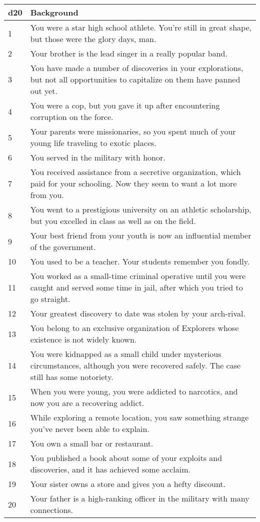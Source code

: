 \begin{table*}
\begin{tabularx}{\textwidth}{| p{} | p{} |}
\hline
\textbf{d20} & \textbf{Background} \\
\hline
1 & You were a star high school athlete. You’re still in great shape, but those were the glory days, man. \\ \hline
2 & Your brother is the lead singer in a really popular band. \\ \hline
3 & You have made a number of discoveries in your explorations, but not all opportunities to capitalize on them have panned out yet.  \\ \hline
4 & You were a cop, but you gave it up after encountering corruption on the force.  \\ \hline
5 & Your parents were missionaries, so you spent much of your young life traveling to exotic places. \\ \hline
6 & You served in the military with honor. \\ \hline
7 & You received assistance from a secretive organization, which paid for your schooling. Now they seem to want a lot more from you. \\ \hline
8 & You went to a prestigious university on an athletic scholarship, but you excelled in class as well as on the field.  \\ \hline
9 & Your best friend from your youth is now an influential member of the government.  \\ \hline
10 & You used to be a teacher. Your students remember you fondly. \\ \hline
11 & You worked as a small-time criminal operative until you were caught and served some time in jail, after which you tried to go straight. \\ \hline
12 & Your greatest discovery to date was stolen by your arch-rival. \\ \hline
13 & You belong to an exclusive organization of Explorers whose existence is not widely known. \\ \hline
14 & You were kidnapped as a small child under mysterious circumstances, although you were recovered safely. The case still has some notoriety. \\ \hline
15 & When you were young, you were addicted to narcotics, and now you are a recovering addict. \\ \hline
16 & While exploring a remote location, you saw something strange you’ve never been able to explain. \\ \hline
17 & You own a small bar or restaurant. \\ \hline
18 & You published a book about some of your exploits and discoveries, and it has achieved some acclaim. \\ \hline
19 & Your sister owns a store and gives you a hefty discount. \\ \hline
20 & Your father is a high-ranking officer in the military with many connections. \\ \hline

\end{tabularx}

\end{table*}

